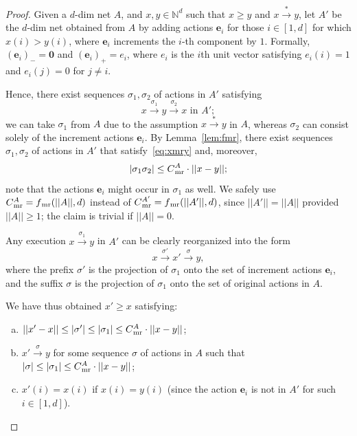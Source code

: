 \documentclass[11pt,a4paper]{amsart}
\newcommand{\step}[1]{\mathrel{\xrightarrow{#1}}}
\newcommand{\reach}{\step{*}}
\newcommand{\nnorm}[1]{||#1||}
\newcommand{\mr}{{}_\textnormal{mr}}
\newcommand{\Nat}{\mathbb{N}}
\newcommand{\setN}{\Nat}
\theoremstyle{plain}
\theoremstyle{definition}
\theoremstyle{defC}
\theoremstyle{thmC}
\begin{document}
\begin{proof}
Given a $d$-dim net $A$, and $x,y\in\setN^d$ such that $x\geq y$ and $x\reach y$,
	let $A'$ be 
the $d$-dim net obtained from $A$ by adding actions
	$\mathbf{e}_i$ for those $i\in[1,d]$ for which $x(i)>y(i)$, where $\mathbf{e}_i$
increments the
	$i$-th component by $1$.
	Formally,
	$(\mathbf{e}_i)_-=\mathbf{0}$ and $(\mathbf{e}_i)_+=e_i$,
	where $e_i$
is the $i$th unit vector satisfying
	$e_i(i)=1$ and $e_i(j)=0$ for 
	$j\neq i$.

Hence, there exist sequences $\sigma_1,\sigma_2$ of actions in $A'$
	satisfying
	\begin{equation}\label{eq:xmry}
	x\step{\sigma_1}y\step{\sigma_2}x\text{ in }A';
	\end{equation}
we can take $\sigma_1$ from $A$ due to the assumption $x\reach y$ in $A$,
whereas $\sigma_2$ can consist solely of the increment actions $\mathbf{e}_i$.
	By Lemma~\ref{lem:fmr}, there exist sequences
	$\sigma_1,\sigma_2$  of actions in $A'$
	that satisfy~\eqref{eq:xmry} and, moreover,
	\[|\sigma_1\sigma_2|\leq C\mr^A\cdot
\nnorm{x-y};\]
note that the actions $\mathbf{e}_i$ might occur
	in $\sigma_1$ as well. We safely use $C\mr^A=f\mr(\nnorm{A},d)$ instead of
	$C\mr^{A'}=f\mr(\nnorm{A'},d)$, since $\nnorm{A'}=\nnorm{A}$
	provided $\nnorm{A}\geq 1$; the claim is trivial if
	$\nnorm{A}=0$.

Any execution $x\step{\sigma_1}y$ in $A'$ can be clearly reorganized
	into the form 
	\[x\step{\sigma'}x'\step{\sigma}y,\] 
where 
the prefix $\sigma'$ is the projection of $\sigma_1$ onto
	the  set 
of increment actions $\mathbf{e}_i$, and
the suffix $\sigma$ is the projection of $\sigma_1$ onto
	the   set of original 
 actions in $A$.

	We have
	thus obtained $x'\geq x$ satisfying:
	\begin{enumerate}[a)]	
		\item $\nnorm{x'-x}\leq |\sigma'|\leq |\sigma_1|\leq C\mr^A\cdot \nnorm{x-y}$; 
		\item
			$x'\step{\sigma}y$ for some sequence $\sigma$ of actions in $A$
			such that $|\sigma|\leq |\sigma_1|\leq C\mr^A\cdot
			\nnorm{x-y}$;
	\item $x'(i)=x(i)$ if $x(i)=y(i)$ (since the action
		$\mathbf{e}_i$ is not in $A'$ for such $i\in[1,d]$).
			\qedhere
	\end{enumerate}
\end{proof}
\end{document}
